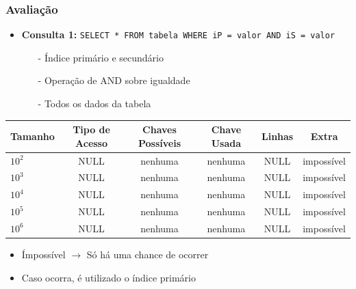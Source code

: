 \documentclass[10pt]{beamer}
\begin{document}
\begin{frame}[fragile]
  \frametitle{Avaliação}

    \begin{itemize}
      \item \textbf{Consulta 1: } \footnotesize{\texttt{SELECT * FROM tabela WHERE iP = valor AND iS = valor}}
      \begin{itemize}
        \item[-] Índice primário e secundário
        \item[-] Operação de AND sobre igualdade
        \item[-] Todos os dados da tabela
      \end{itemize}

    \end{itemize}

     \begin{table}[!htb]
    \footnotesize
    \centering
    \begin{tabular}{lccccc}
      \toprule
      \textbf{Tamanho} & \textbf{Tipo de Acesso}  & \textbf{Chaves Possíveis}  & \textbf{Chave Usada} & \textbf{Linhas} & \textbf{Extra}  \\
      \midrule
      $10^2$  & NULL  &  nenhuma  & nenhuma  & NULL  & impossível \\
      $10^3$  & NULL  &  nenhuma  & nenhuma  & NULL  & impossível \\
      $10^4$  & NULL  &  nenhuma  & nenhuma  & NULL  & impossível \\
      $10^5$  & NULL  &  nenhuma  & nenhuma  & NULL  & impossível \\
      $10^6$  & NULL  &  nenhuma  & nenhuma  & NULL  & impossível \\

      \bottomrule
    \end{tabular}
    \end{table}
   
    \begin{itemize}
    \item Ímpossível $\to$ Só há uma chance de ocorrer
    \item Caso ocorra, é utilizado o índice primário
    \end{itemize}


\end{frame}
\end{document}
